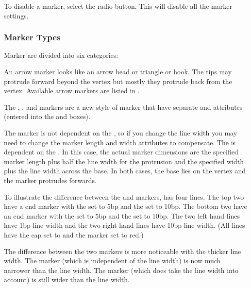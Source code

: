 
To disable a marker, select the  radio
button. This will disable all the marker settings.

\subsubsection{Marker Types}\label{sec:markertypes}

Marker 
are divided into six categories:


An arrow marker looks like an arrow head or triangle or hook.
The tips may protrude forward beyond the vertex but mostly they protrude
back from the vertex.
Available arrow markers are listed in .

The , ,
 and 
markers are a new style of marker that have separate
 and  attributes (entered
into the  and  boxes). 

The  marker is not
dependent on the , so if you change the line width you may
need to change the marker length and width attributes to compensate.
The  is dependent on the
. In this case, the actual marker dimensions
are the specified marker length plus half the line width for the
protrusion and the specified width plus the line width across the base.
In both cases, the base lies on the vertex and the marker protrudes forwards.

To illustrate the difference between the  and
 markers, 
has four lines. The top two have a  end marker
with the  set to 5bp and the 
set to 10bp. The bottom two have an  end marker
with the  set to 5bp and the 
set to 10bp. The two left hand lines have 1bp line width and the
two right hand lines have 10bp line width. (All lines have the cap
set to  and the marker 
set to red.)

The difference between the two markers is more noticeable with the
thicker line width. The  marker (which
is independent of the line width) is now much narrower than the line
width. The   marker (which does take the
line width into account) is still wider than the line width.

